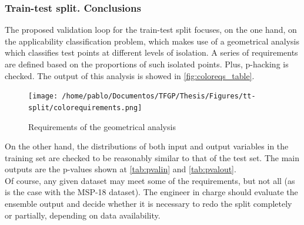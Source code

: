 \subsubsection{Train-test split. Conclusions}
\indent The proposed validation loop for the train-test split focuses, on the one hand, on the applicability classification problem, which makes use of a geometrical analysis which classifies test points at different levels of isolation. A series of requirements are defined based on the proportions of such isolated points. Plus, p-hacking is checked. The output of this analysis is showed in \autoref{fig:coloreqs_table}.\\
%
\begin{figure}[!htb]
	\centering
	\texttt{[image: /home/pablo/Documentos/TFGP/Thesis/Figures/tt-split/colorequirements.png]}
	\caption{Requirements of the geometrical analysis}
	\label{fig:coloreqs_table}
\end{figure}
\indent On the other hand, the distributions of both input and output variables in the training set are checked to be reasonably similar to that of the test set. The main outputs are the p-values shown at \autoref{tab:pvalin} and \autoref{tab:pvalout}.\\
%
\indent Of course, any given dataset may meet some of the requirements, but not all (as is the case with the MSP-18 dataset). The engineer in charge should evaluate the ensemble output and decide whether it is necessary to redo the split completely or partially, depending on data availability.\\
%
\clearpage
